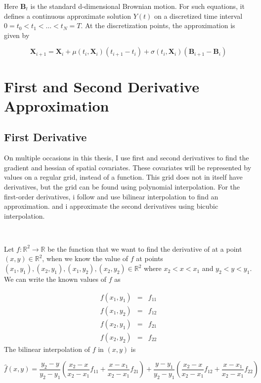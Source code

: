 Here $\textbf{B}_t$ is the standard d-dimensional Brownian motion. For such equations, it defines a continuous approximate solution $Y(t)$ on a discretized time interval $0=t_0 < t_1 < \dots < t_N = T$. At the discretization points, the approximation is given by

\begin{equation}
    \textbf{X}_{i+1} = \textbf{X}_i + \mu(t_i, \textbf{X}_i)(t_{i+1} - t_i) + \sigma(t_i, \textbf{X}_i)(\textbf{B}_{i+1} - \textbf{B}_i)
    \label{eq: euler approximation}
\end{equation}




\section{First and Second Derivative Approximation}
\subsection{First Derivative}
\label{subsec: gradient estimation}
On multiple occasions in this thesis, I use first and second derivatives to find the gradient and hessian of spatial covariates. These covariates will be represented by values on a regular grid, instead of a function. This grid does not in itself have derivatives, but the grid can be found using polynomial interpolation. For the first-order derivatives, i follow \parencite{michelot_langevin_2019} and use bilinear interpolation to find an approximation. and i approximate the second derivatives using bicubic interpolation. 

\

Let $f:\mathbb{R}^2\rightarrow \mathbb{R}$ be the function that we want to find the derivative of at a point $(x,y) \in \mathbb{R}^2$, when we know the value of $f$ at points $(x_1, y_1), (x_2, y_1), (x_1, y_2), (x_2, y_2) \in \mathbb{R}^2$ where $x_2 < x < x_1$ and $y_2 < y < y_1$. We can write the known values of $f$ as 


$$
\begin{array}{lcl}
     f(x_1, y_1)& = & f_{11}  \\
     f(x_1, y_2)& = & f_{12}  \\
     f(x_2, y_1)& = & f_{21}  \\
     f(x_2, y_2)& = & f_{22}  
\end{array}
$$
The bilinear interpolation of $f$ in $(x,y)$ is  

$$
\hat{f}(x,y) = \frac{y_2-y}{y_2-y_1}(\frac{x_2-x}{x_2-x_1}f_{11} + \frac{x-x_1}{x_2-x_1}f_{21}) + \frac{y-y_1}{y_2-y_1}(\frac{x_2-x}{x_2-x_1}f_{12} + \frac{x-x_1}{x_2-x_1}f_{22})
$$


